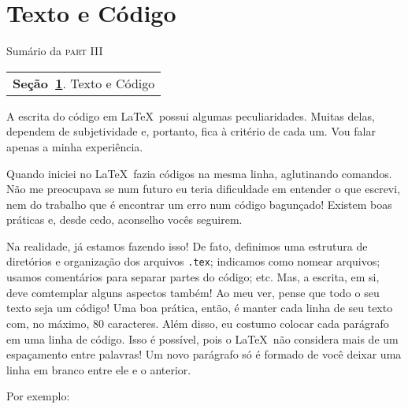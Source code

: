 \section{Texto e Código} %
\label{sec:textoCodigo}

\begin{margintable}\vspace{.8in}\footnotesize
  \caption{Sumário da \textsc{part III}}
  \medskip
  \begin{tabularx}{\marginparwidth}{|X}
    \textbf{\sffamily \textcolor{azulUFRB}{Seção}~\ref{sec:textoCodigo}}.    {\sffamily Texto e Código} \\
  \end{tabularx}
\end{margintable}

A escrita do código em \LaTeX\ possui algumas peculiaridades.
Muitas delas, dependem de subjetividade e, portanto, fica à critério de cada um.
Vou falar apenas a minha experiência.

Quando iniciei no \LaTeX\ fazia códigos na mesma linha, aglutinando comandos.
Não me preocupava se num futuro eu teria dificuldade em entender o que escrevi, 
nem do trabalho que é encontrar um erro num código bagunçado!
Existem boas práticas e, desde cedo, aconselho vocês seguirem.

Na realidade, já estamos fazendo isso!
De fato, definimos uma estrutura de diretórios e organização dos arquivos 
\texttt{.tex}; indicamos como nomear arquivos; usamos comentários para separar 
partes do código; etc. 
Mas, a escrita, em si, deve comtemplar alguns aspectos também!
Ao meu ver, pense que todo o seu texto seja um código!
Uma boa prática, então, é manter cada linha de seu texto com, no máximo, 80 
caracteres.
Além disso, eu costumo colocar cada parágrafo em uma linha de código.
Isso é possível, pois o \LaTeX\ não considera mais de um espaçamento entre 
palavras!
Um novo parágrafo só é formado de você deixar uma linha em branco entre ele e o
anterior.

Por exemplo:

